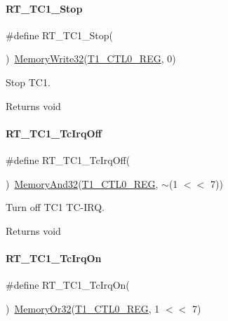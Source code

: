 \paragraph{\texorpdfstring{R\+T\+\_\+\+T\+C1\+\_\+\+Stop}{RT\_TC1\_Stop}}
{\footnotesize\ttfamily \#define R\+T\+\_\+\+T\+C1\+\_\+\+Stop(\begin{DoxyParamCaption}{ }\end{DoxyParamCaption})~\mbox{\hyperlink{a00020_a6b9732365b12e48ddb89fe1028b975b0}{Memory\+Write32}}(\mbox{\hyperlink{a00020_a55600694c3c73a1019f78d306f474fa1}{T1\+\_\+\+C\+T\+L0\+\_\+\+R\+EG}}, 0)}



Stop T\+C1. 

\begin{DoxyReturn}{Returns}
void 
\end{DoxyReturn}
\mbox{\label{a00044_ad8775d32f1b8cb982c2abf045e3b6b95}} 
\paragraph{\texorpdfstring{R\+T\+\_\+\+T\+C1\+\_\+\+Tc\+Irq\+Off}{RT\_TC1\_TcIrqOff}}
{\footnotesize\ttfamily \#define R\+T\+\_\+\+T\+C1\+\_\+\+Tc\+Irq\+Off(\begin{DoxyParamCaption}{ }\end{DoxyParamCaption})~\mbox{\hyperlink{a00020_ad87cedffcaadc51db22594fce55173d4}{Memory\+And32}}(\mbox{\hyperlink{a00020_a55600694c3c73a1019f78d306f474fa1}{T1\+\_\+\+C\+T\+L0\+\_\+\+R\+EG}}, $\sim$(1 $<$$<$ 7))}



Turn off T\+C1 T\+C-\/\+I\+RQ. 

\begin{DoxyReturn}{Returns}
void 
\end{DoxyReturn}
\mbox{\label{a00044_adbef657c94c7b32f07e4210fbf7f4745}} 
\paragraph{\texorpdfstring{R\+T\+\_\+\+T\+C1\+\_\+\+Tc\+Irq\+On}{RT\_TC1\_TcIrqOn}}
{\footnotesize\ttfamily \#define R\+T\+\_\+\+T\+C1\+\_\+\+Tc\+Irq\+On(\begin{DoxyParamCaption}{ }\end{DoxyParamCaption})~\mbox{\hyperlink{a00020_a27874a97deab7cecdde5ddecf466e31e}{Memory\+Or32}}(\mbox{\hyperlink{a00020_a55600694c3c73a1019f78d306f474fa1}{T1\+\_\+\+C\+T\+L0\+\_\+\+R\+EG}}, 1 $<$$<$ 7)}




